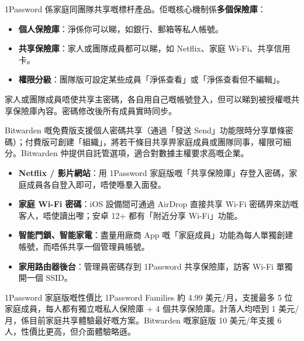 
1Password 係家庭同團隊共享嘅標杆產品。佢嘅核心機制係\textbf{多個保險庫}：

\begin{itemize}
  \item \textbf{個人保險庫}：淨係你可以睇，如銀行、郵箱等私人帳號。
  \item \textbf{共享保險庫}：家人或團隊成員都可以睇，如 Netflix、家庭 Wi-Fi、共享信用卡。
  \item \textbf{權限分級}：團隊版可設定某些成員「淨係查看」或「淨係查看但不編輯」。
\end{itemize}

家人或團隊成員唔使共享主密碼，各自用自己嘅帳號登入，但可以睇到被授權嘅共享保險庫內容。密碼修改後所有成員實時同步。


Bitwarden 嘅免費版支援個人密碼共享（通過「發送 Send」功能限時分享單條密碼）；付費版可創建「組織」，將若干條目共享畀家庭成員或團隊同事，權限可細分。Bitwarden 仲提供自託管選項，適合對數據主權要求高嘅企業。


\begin{itemize}
  \item \textbf{Netflix / 影片網站}：用 1Password 家庭版嘅「共享保險庫」存登入密碼，家庭成員各自登入即可，唔使喺羣入面發。
  \item \textbf{家庭 Wi-Fi 密碼}：iOS 設備間可通過 AirDrop 直接共享 Wi-Fi 密碼畀來訪嘅客人，唔使讀出嚟；安卓 12+ 都有「附近分享 Wi-Fi」功能。
  \item \textbf{智能門鎖、智能家電}：盡量用廠商 App 嘅「家庭成員」功能為每人單獨創建帳號，而唔係共享一個管理員帳號。
  \item \textbf{家用路由器後台}：管理員密碼存到 1Password 共享保險庫，訪客 Wi-Fi 單獨開一個 SSID。
\end{itemize}

\begin{tcbinfo}{1Password 家庭版嘅性價比}
1Password Families 約 4.99 美元/月，支援最多 5 位家庭成員，每人都有獨立嘅私人保險庫 + 4 個共享保險庫。計落人均唔到 1 美元/月，係目前家庭共享體驗最好嘅方案。Bitwarden 嘅家庭版 10 美元/年支援 6 人，性價比更高，但介面體驗略遜。

\end{tcbinfo}


